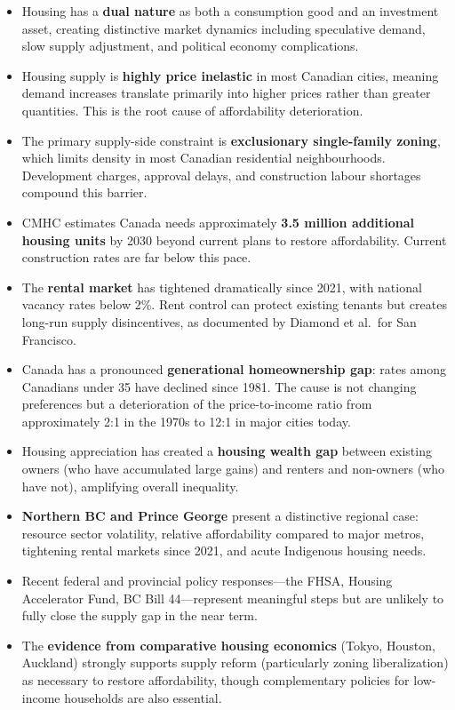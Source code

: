 \begin{itemize}
  \item Housing has a \textbf{dual nature} as both a consumption good and an investment asset, creating distinctive market dynamics including speculative demand, slow supply adjustment, and political economy complications.
  \item Housing supply is \textbf{highly price inelastic} in most Canadian cities, meaning demand increases translate primarily into higher prices rather than greater quantities. This is the root cause of affordability deterioration.
  \item The primary supply-side constraint is \textbf{exclusionary single-family zoning}, which limits density in most Canadian residential neighbourhoods. Development charges, approval delays, and construction labour shortages compound this barrier.
  \item CMHC estimates Canada needs approximately \textbf{3.5 million additional housing units} by 2030 beyond current plans to restore affordability. Current construction rates are far below this pace.
  \item The \textbf{rental market} has tightened dramatically since 2021, with national vacancy rates below 2\%. Rent control can protect existing tenants but creates long-run supply disincentives, as documented by Diamond et al.\ for San Francisco.
  \item Canada has a pronounced \textbf{generational homeownership gap}: rates among Canadians under 35 have declined since 1981. The cause is not changing preferences but a deterioration of the price-to-income ratio from approximately 2:1 in the 1970s to 12:1 in major cities today.
  \item Housing appreciation has created a \textbf{housing wealth gap} between existing owners (who have accumulated large gains) and renters and non-owners (who have not), amplifying overall inequality.
  \item \textbf{Northern BC and Prince George} present a distinctive regional case: resource sector volatility, relative affordability compared to major metros, tightening rental markets since 2021, and acute Indigenous housing needs.
  \item Recent federal and provincial policy responses---the FHSA, Housing Accelerator Fund, BC Bill 44---represent meaningful steps but are unlikely to fully close the supply gap in the near term.
  \item The \textbf{evidence from comparative housing economics} (Tokyo, Houston, Auckland) strongly supports supply reform (particularly zoning liberalization) as necessary to restore affordability, though complementary policies for low-income households are also essential.
\end{itemize}

